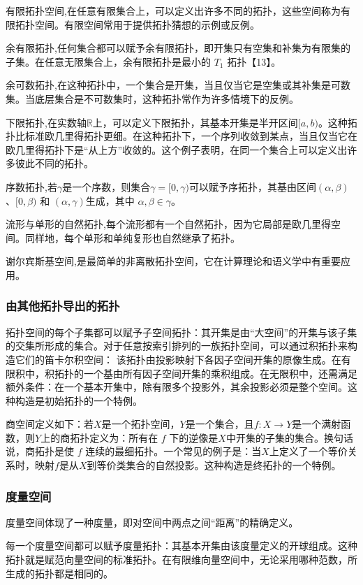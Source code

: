 有限拓扑空间,在任意有限集合上，可以定义出许多不同的拓扑，这些空间称为有限拓扑空间。有限空间常用于提供拓扑猜想的示例或反例。

余有限拓扑,任何集合都可以赋予余有限拓扑，即开集只有空集和补集为有限集的子集。在任意无限集合上，余有限拓扑是最小的 $T_1$ 拓扑【13】。

余可数拓扑,在这种拓扑中，一个集合是开集，当且仅当它是空集或其补集是可数集。当底层集合是不可数集时，这种拓扑常作为许多情境下的反例。

下限拓扑,在实数轴$\mathbb{R}$上，可以定义下限拓扑，其基本开集是半开区间$[a, b)$。这种拓扑比标准欧几里得拓扑更细。在这种拓扑下，一个序列收敛到某点，当且仅当它在欧几里得拓扑下是“从上方”收敛的。这个例子表明，在同一个集合上可以定义出许多彼此不同的拓扑。

序数拓扑,若$\gamma$是一个序数，则集合$\gamma = [0, \gamma)$可以赋予序拓扑，其基由区间$(\alpha, \beta)$、$[0, \beta)$ 和 $(\alpha, \gamma)$生成，其中 $\alpha, \beta \in \gamma$。

流形与单形的自然拓扑,每个流形都有一个自然拓扑，因为它局部是欧几里得空间。同样地，每个单形和单纯复形也自然继承了拓扑。

谢尔宾斯基空间,是最简单的非离散拓扑空间，它在计算理论和语义学中有重要应用。
\subsubsection{由其他拓扑导出的拓扑}
拓扑空间的每个子集都可以赋予子空间拓扑：其开集是由“大空间”的开集与该子集的交集所形成的集合。对于任意按索引排列的一族拓扑空间，可以通过积拓扑来构造它们的笛卡尔积空间：
该拓扑由投影映射下各因子空间开集的原像生成。在有限积中，积拓扑的一个基由所有因子空间开集的乘积组成。在无限积中，还需满足额外条件：在一个基本开集中，除有限多个投影外，其余投影必须是整个空间。这种构造是初始拓扑的一个特例。

商空间定义如下：若$X$是一个拓扑空间，$Y$是一个集合，且$f: X \to Y$是一个满射函数，则$Y$上的商拓扑定义为：所有在 $f$ 下的逆像是$X$中开集的子集的集合。换句话说，商拓扑是使 $f$ 连续的最细拓扑。一个常见的例子是：当$X$上定义了一个等价关系时，映射$f$是从$X$到等价类集合的自然投影。这种构造是终拓扑的一个特例。
\subsubsection{度量空间}
度量空间体现了一种度量，即对空间中两点之间“距离”的精确定义。

每一个度量空间都可以赋予度量拓扑：其基本开集由该度量定义的开球组成。这种拓扑就是赋范向量空间的标准拓扑。在有限维向量空间中，无论采用哪种范数，所生成的拓扑都是相同的。


